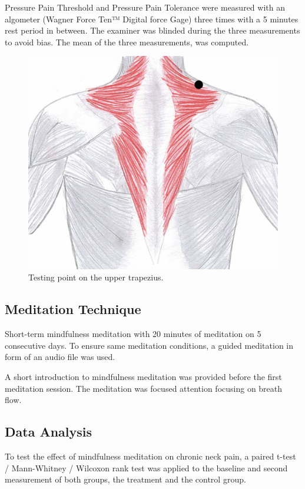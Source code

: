 Pressure Pain Threshold and Pressure Pain Tolerance were measured with an algometer (Wagner Force Ten™ Digital force Gage) three times with a 5 minutes rest period in between. The examiner was blinded during the three measurements to avoid bias. The mean of the three measurements, was computed. 

\begin{figure}[H]
\centering
\includegraphics[width=.7\columnwidth]{../figures/trapezius}
\caption{Testing point on the upper trapezius.}
\label{fig:trapezius}
\end{figure} \vspace{-.5cm}


\subsection{Meditation Technique}
Short-term mindfulness meditation with 20 minutes of meditation on 5 consecutive days. To ensure same meditation conditions, a guided meditation in form of an audio file was used. 

A short introduction to mindfulness meditation was provided before the first meditation session. The meditation was focused attention focusing on breath flow.

\subsection{Data Analysis}
To test the effect of mindfulness meditation on chronic neck pain, a paired t-test / Mann-Whitney / Wilcoxon rank test was applied to the baseline and second measurement of both groups, the treatment and the control group.
